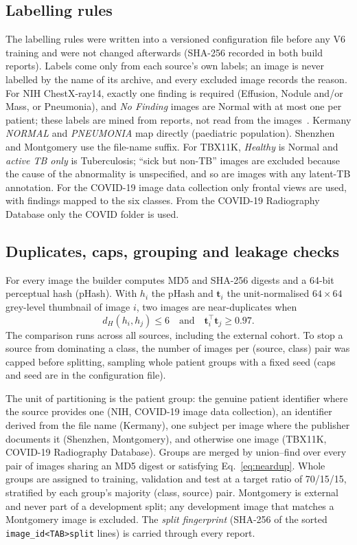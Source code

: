 \subsection{Labelling rules}
\label{sec:labels}
The labelling rules were written into a versioned configuration file before any V6 training and were not changed afterwards (SHA-256 recorded in both build reports). Labels come only from each source's own labels; an image is never labelled by the name of its archive, and every excluded image records the reason. For NIH ChestX-ray14, exactly one finding is required (Effusion, Nodule and/or Mass, or Pneumonia), and \emph{No Finding} images are Normal with at most one per patient; these labels are mined from reports, not read from the images~\cite{wang2017chestxray8,oakdenrayner2020exploring}. Kermany \emph{NORMAL} and \emph{PNEUMONIA} map directly (paediatric population). Shenzhen and Montgomery use the file-name suffix. For TBX11K, \emph{Healthy} is Normal and \emph{active TB only} is Tuberculosis; ``sick but non-TB'' images are excluded because the cause of the abnormality is unspecified, and so are images with any latent-TB annotation. For the COVID-19 image data collection only frontal views are used, with findings mapped to the six classes. From the COVID-19 Radiography Database only the COVID folder is used.

\subsection{Duplicates, caps, grouping and leakage checks}
\label{sec:split}
For every image the builder computes MD5 and SHA-256 digests and a 64-bit perceptual hash (pHash). With $h_i$ the pHash and $\mathbf{t}_i$ the unit-normalised $64\times64$ grey-level thumbnail of image $i$, two images are near-duplicates when
\begin{equation}
d_H(h_i,h_j)\le 6\quad\text{and}\quad \mathbf{t}_i^{\top}\mathbf{t}_j\ge 0.97 .
\label{eq:neardup}
\end{equation}
The comparison runs across all sources, including the external cohort. To stop a source from dominating a class, the number of images per (source, class) pair was capped before splitting, sampling whole patient groups with a fixed seed (caps and seed are in the configuration file).

The unit of partitioning is the patient group: the genuine patient identifier where the source provides one (NIH, COVID-19 image data collection), an identifier derived from the file name (Kermany), one subject per image where the publisher documents it (Shenzhen, Montgomery), and otherwise one image (TBX11K, COVID-19 Radiography Database). Groups are merged by union--find over every pair of images sharing an MD5 digest or satisfying Eq.~\eqref{eq:neardup}. Whole groups are assigned to training, validation and test at a target ratio of 70/15/15, stratified by each group's majority (class, source) pair. Montgomery is external and never part of a development split; any development image that matches a Montgomery image is excluded. The \emph{split fingerprint} (SHA-256 of the sorted \texttt{image\_id<TAB>split} lines) is carried through every report.

